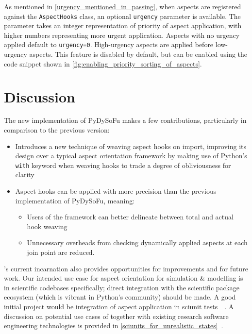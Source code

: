 As mentioned in \cref{urgency_mentioned_in_passing}, when aspects are registered
against the \lstinline{AspectHooks} class, an optional \lstinline{urgency}
parameter is available. The parameter takes an integer representation of
priority of aspect application, with higher numbers representing more urgent
application. Aspects with no urgency applied default to \lstinline{urgency=0}.
High-urgency aspects are applied before low-urgency aspects. This feature is
disabled by default, but can be enabled using the code snippet shown in
\cref{fig:enabling_priority_sorting_of_aspects}.


\section{Discussion}

The new implementation of PyDySoFu makes a few
contributions, particularly in comparison to the
previous version:

\begin{itemize}
    \item Introduces a new technique of weaving aspect hooks on import,
    improving its design over a typical aspect orientation framework by making
    use of Python's \lstinline{with} keyword when weaving hooks to trade a
    degree of obliviousness for clarity
    \item Aspect hooks can be applied with more precision than the previous
    implementation of PyDySoFu, meaning:
        \begin{itemize}
        \item Users of the framework can better delineate between total and
        actual hook weaving
        \item Unnecessary overheads from checking dynamically applied aspects at
        each join point are reduced.
        \end{itemize}
\end{itemize}

\pdsf{}'s current incarnation also provides opportunities for improvements and
for future work. Our intended use case for aspect orientation for simulation \&
modelling is in scientific codebases specifically; direct integration with the
scientific package ecosystem (which is vibrant in Python's community) should be
made. A good initial project would be integration of aspect application in
sciunit tests~\cite{sciunit_primer}~. A discussion on potential use cases of
\pdsf together with existing research software engineering technologies is
provided in \cref{sciunits_for_unrealistic_states}~.

